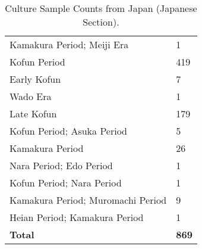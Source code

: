 \documentclass[11pt]{article}
\begin{document}
\begin{table}[t!]
\begin{tabularx}{\columnwidth}{Xl}
        Kamakura Period; Meiji Era & 1 \\
        Kofun Period & 419 \\
        Early Kofun & 7 \\
        Wado Era & 1 \\
        Late Kofun & 179 \\
        Kofun Period; Asuka Period & 5 \\
        Kamakura Period & 26 \\
        Nara Period; Edo Period & 1 \\
        Kofun Period; Nara Period & 1 \\
        Kamakura Period; Muromachi Period & 9 \\
        Heian Period; Kamakura Period & 1 \\
        \hline
        \rowcolor{brown!10}\textbf{Total} & \textbf{869} \\
        \hline
    \end{tabularx}
    \caption{Culture Sample Counts from Japan (Japanese Section).}
    \label{tab:culture-sample-japan}
\end{table}
\end{document}
